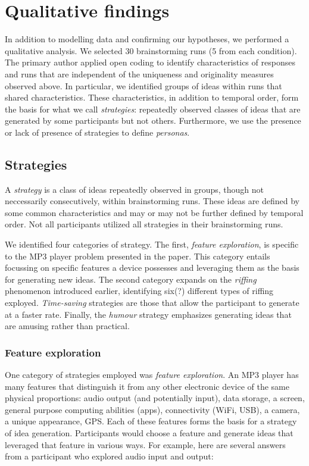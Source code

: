 \section{Qualitative findings}

In addition to modelling data and confirming our hypotheses, we performed a qualitative analysis.
We selected 30 brainstorming runs (5 from each condition). The primary author applied open coding to identify characteristics of responses and runs that are independent of the uniqueness and originality measures observed above. In particular, we identified groups of ideas within runs that shared characteristics. These characteristics, in addition to temporal order, form the basis for what we call \emph{strategies}: repeatedly observed classes of ideas that are generated by some participants but not others.
Furthermore, we use the presence or lack of presence of strategies to define \emph{personas}.

\subsection{Strategies}

A \emph{strategy} is a class of ideas repeatedly observed in groups, though not neccessarily consecutively, within brainstorming runs. These ideas are defined by some common characteristics and may or may not be further defined by temporal order. Not all participants utilized all strategies in their brainstorming runs.

We identified four categories of strategy. The first, \emph{feature exploration}, is specific to the MP3 player problem presented in the paper. This category entails focussing on specific features a device possesses and leveraging them as the basis for generating new ideas. The second category expands on the \emph{riffing} phenomenon introduced earlier, identifying six(?) different types of riffing exployed. \emph{Time-saving} strategies are those that allow the participant to generate at a faster rate. Finally, the \emph{humour} strategy emphasizes generating ideas that are amusing rather than practical.

\subsubsection{Feature exploration}

One category of strategies employed was \emph{feature exploration}. An MP3 player has many features that distinguish it from any other electronic device of the same physical proportions: audio output (and potentially input), data storage, a screen, general purpose computing abilities (apps), connectivity (WiFi, USB), a camera, a unique appearance, GPS.
Each of these features forms the basis for a strategy of idea generation.
Participants would choose a feature and generate ideas that leveraged that feature in various ways. For example, here are several answers from a participant who explored audio input and output:

